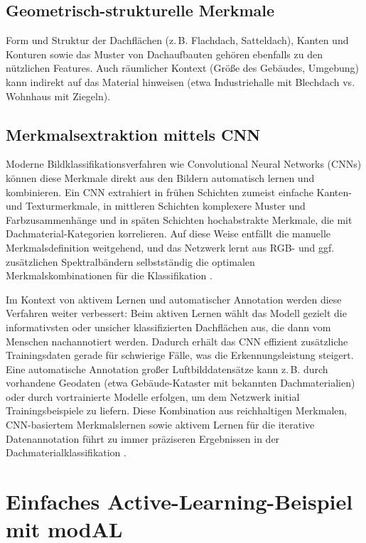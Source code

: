 \documentclass{article}
\begin{document}
	\subsection{Geometrisch-strukturelle Merkmale}
	Form und Struktur der Dachflächen (z.\,B. Flachdach, Satteldach), Kanten und Konturen sowie das Muster von Dachaufbauten gehören ebenfalls zu den nützlichen Features. Auch räumlicher Kontext (Größe des Gebäudes, Umgebung) kann indirekt auf das Material hinweisen (etwa Industriehalle mit Blechdach vs. Wohnhaus mit Ziegeln)\cite{Kim2021}.
	
	\subsection{Merkmalsextraktion mittels CNN}
	Moderne Bildklassifikationsverfahren wie Convolutional Neural Networks (CNNs) können diese Merkmale direkt aus den Bildern automatisch lernen und kombinieren. Ein CNN extrahiert in frühen Schichten zumeist einfache Kanten- und Texturmerkmale, in mittleren Schichten komplexere Muster und Farbzusammenhänge und in späten Schichten hochabstrakte Merkmale, die mit Dachmaterial-Kategorien korrelieren. Auf diese Weise entfällt die manuelle Merkmalsdefinition weitgehend, und das Netzwerk lernt aus RGB- und ggf. zusätzlichen Spektralbändern selbstständig die optimalen Merkmalskombinationen für die Klassifikation \cite{Kim2021}.
	
	Im Kontext von aktivem Lernen und automatischer Annotation werden diese Verfahren weiter verbessert: Beim aktiven Lernen wählt das Modell gezielt die informativsten oder unsicher klassifizierten Dachflächen aus, die dann vom Menschen nachannotiert werden. Dadurch erhält das CNN effizient zusätzliche Trainingsdaten gerade für schwierige Fälle, was die Erkennungsleistung steigert. Eine automatische Annotation großer Luftbilddatensätze kann z.\,B. durch vorhandene Geodaten (etwa Gebäude-Kataster mit bekannten Dachmaterialien) oder durch vortrainierte Modelle erfolgen, um dem Netzwerk initial Trainingsbeispiele zu liefern. Diese Kombination aus reichhaltigen Merkmalen, CNN-basiertem Merkmalslernen sowie aktivem Lernen für die iterative Datenannotation führt zu immer präziseren Ergebnissen in der Dachmaterialklassifikation \cite{Kim2021}.
	
\section{Einfaches Active-Learning-Beispiel mit modAL}
\end{document}
